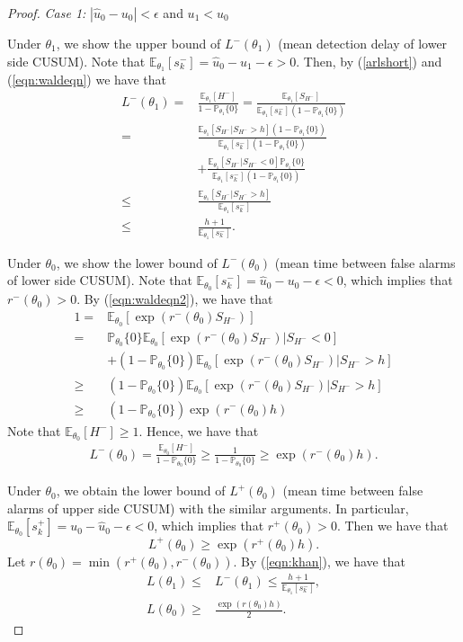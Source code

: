 \documentclass[letterpaper]{article} %
\begin{document}
\begin{proof}
\emph{Case 1:} $|\hat{u}_0-u_0|<\epsilon$ and $u_1<u_0$

Under $\theta_1$, we show the upper bound of $L^-(\theta_1)$ (mean detection delay of lower side CUSUM). Note that $\mathbb{E}_{\theta_1}[s^-_k]=\hat{u}_0-u_1-\epsilon>0$. Then, by (\ref{arlshort}) and (\ref{eqn:waldeqn})
we have that
\begin{align}
L^-(\theta_1)=&\frac{\mathbb{E}_{\theta_1}[H^-]}{1-\mathbb{P}_{\theta_1}\{0\}}=\frac{\mathbb{E}_{\theta_1}[S_{H^-}]}{\mathbb{E}_{\theta_1}[s^-_k](1-\mathbb{P}_{\theta_1}\{0\})}\\\nonumber
=&\frac{\mathbb{E}_{\theta_1}[S_{H^-}|S_{H^-}> h](1-\mathbb{P}_{\theta_1}\{0\})}{\mathbb{E}_{\theta_1}[s^-_k](1-\mathbb{P}_{\theta_1}\{0\})}\\
&+\frac{\mathbb{E}_{\theta_1}[S_{H^-}|S_{H^-}<0]\mathbb{P}_{\theta_1}\{0\}}{\mathbb{E}_{\theta_1}[s^-_k](1-\mathbb{P}_{\theta_1}\{0\})}\\
\leq&\frac{\mathbb{E}_{\theta_1}[S_{H^-}|S_{H^-}> h]}{\mathbb{E}_{\theta_1}[s^-_k]}\\
\leq&\frac{h+1}{\mathbb{E}_{\theta_1}[s^-_k]}.
\end{align}

Under $\theta_0$, we show the lower bound of $L^-(\theta_0)$ (mean time between false alarms of lower side CUSUM). Note that $\mathbb{E}_{\theta_0}[s^-_k]=\hat{u}_0-u_0-\epsilon<0$, which implies that $r^-(\theta_0)>0$. By (\ref{eqn:waldeqn2}), we have that
\begin{align}
1=&\mathbb{E}_{\theta_0}[\exp{(r^-(\theta_0)S_{H^-})}]\\
=&\mathbb{P}_{\theta_0}\{0\}\mathbb{E}_{\theta_0}[\exp{(r^-(\theta_0)S_{H^-})}|S_{H^-}<0]\\\nonumber
&+(1-\mathbb{P}_{\theta_0}\{0\})\mathbb{E}_{\theta_0}[\exp{(r^-(\theta_0)S_{H^-})}|S_{H^-}>h]\\
\geq&(1-\mathbb{P}_{\theta_0}\{0\})\mathbb{E}_{\theta_0}[\exp{(r^-(\theta_0)S_{H^-})}|S_{H^-}>h]\\
\geq&(1-\mathbb{P}_{\theta_0}\{0\})\exp{(r^-(\theta_0)h)}
\end{align}
Note that $\mathbb{E}_{\theta_0}[H^-]\geq1$. Hence, we have that
\begin{align}
L^-(\theta_0)=\frac{\mathbb{E}_{\theta_0}[H^-]}{1-\mathbb{P}_{\theta_0}\{0\}}\geq\frac{1}{1-\mathbb{P}_{\theta_0}\{0\}}\geq\exp{(r^-(\theta_0)h)}.
\end{align}

Under $\theta_0$, we obtain the lower bound of $L^+(\theta_0)$ (mean time between false alarms of upper side CUSUM) with the similar arguments. In particular, $\mathbb{E}_{\theta_0}[s^+_k]=u_0-\hat{u}_0-\epsilon<0$, which implies that $r^+(\theta_0)>0$. Then we have that
\begin{equation}
L^+(\theta_0)\geq\exp{(r^+(\theta_0)h)}.
\end{equation}
Let $r(\theta_0)=\min(r^+(\theta_0),r^-(\theta_0))$. By (\ref{eqn:khan}), we have that
\begin{align}
L(\theta_1)\leq& L^-(\theta_1)\leq\frac{h+1}{\mathbb{E}_{\theta_1}[s^-_k]},\\
L(\theta_0)\geq&\frac{\exp{(r(\theta_0)h)}}{2}.
\end{align}


\end{proof}
\end{document}
